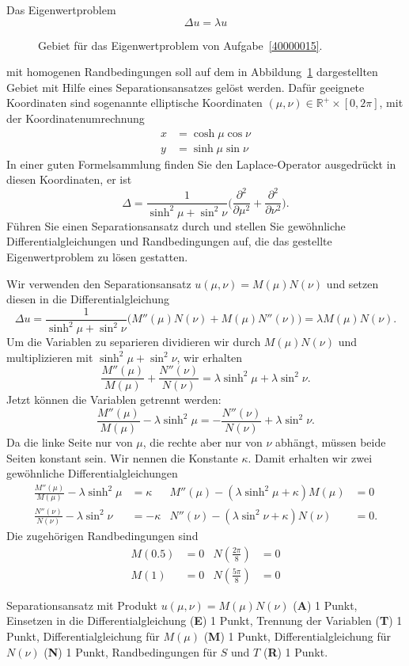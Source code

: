 Das Eigenwertproblem 
\[
\Delta u = \lambda u
\]
\begin{figure}
\centering
{}
\caption{Gebiet für das Eigenwertproblem von Aufgabe~\ref{40000015}.
\label{40000015:gebiet}}
\end{figure}%
mit homogenen Randbedingungen soll auf dem in Abbildung~\ref{40000015:gebiet}
dargestellten Gebiet
mit Hilfe eines Separationsansatzes gelöst werden.
Dafür geeignete Koordinaten sind sogenannte elliptische Koordinaten
$(\mu,\nu)\in \mathbb R^+\times [0,2\pi]$, mit der Koordinatenumrechnung
\begin{align*}
x&=\cosh\mu\cos\nu
\\
y&=\sinh\mu\sin\nu
\end{align*}
In einer guten Formelsammlung finden Sie den Laplace-Operator ausgedrückt
in diesen Koordinaten, er ist
\[
\Delta
=
\frac1{\sinh^2\mu+\sin^2\nu}
\biggl(
\frac{\partial^2}{\partial \mu^2}+\frac{\partial^2}{\partial\nu^2}
\biggr).
\]
Führen Sie einen Separationsansatz durch und stellen Sie gewöhnliche
Differentialgleichungen und Randbedingungen auf, die das gestellte
Eigenwertproblem zu lösen gestatten.

\begin{loesung}
Wir verwenden den Separationsansatz $u(\mu,\nu)=M(\mu)N(\nu)$ und
setzen diesen in die Differentialgleichung
\[
\Delta u
=
\frac1{\sinh^2\mu+\sin^2\nu}
\biggl(
M''(\mu)N(\nu) + M(\mu)N''(\nu)
\biggr)
=
\lambda M(\mu)N(\nu).
\]
Um die Variablen zu separieren dividieren wir durch $M(\mu)N(\nu)$
und multiplizieren mit $\sinh^2\mu+\sin^2\nu$, wir erhalten
\[
\frac{M''(\mu)}{M(\mu)}
+
\frac{N''(\nu)}{N(\nu)}
=
\lambda\sinh^2\mu + \lambda \sin^2\nu.
\]
Jetzt können die Variablen getrennt werden:
\[
\frac{M''(\mu)}{M(\mu)}-\lambda\sinh^2\mu
=
-\frac{N''(\nu)}{N(\nu)}+\lambda\sin^2\nu.
\]
Da die linke Seite nur von $\mu$, die rechte aber nur von $\nu$ abhängt,
müssen beide Seiten konstant sein.
Wir nennen die Konstante $\kappa$.
Damit erhalten wir zwei gewöhnliche Differentialgleichungen
\begin{align*}
\frac{M''(\mu)}{M(\mu)}-\lambda\sinh^2\mu &=  \kappa
&
M''(\mu)-(\lambda\sinh^2\mu+\kappa)M(\mu)&=0
\\
\frac{N''(\nu)}{N(\nu)}-\lambda\sin^2\nu &= -\kappa
&
N''(\nu)-(\lambda\sin^2\nu+\kappa)N(\nu)&=0.
\end{align*}
Die zugehörigen Randbedingungen sind
\begin{align*}
M(0.5)&=0&
N({\textstyle\frac{2\pi}{8}})&=0
\\
M(1)&=0&
N({\textstyle\frac{5\pi}{8}})&=0
\end{align*}
\end{loesung}

\begin{bewertung}
Separationsansatz mit Produkt $u(\mu,\nu) = M(\mu)N(\nu)$ ({\bf A}) 1 Punkt,
Einsetzen in die Differentialgleichung ({\bf E}) 1 Punkt,
Trennung der Variablen ({\bf T}) 1 Punkt,
Differentialgleichung für $M(\mu)$ ({\bf M}) 1 Punkt,
Differentialgleichung für $N(\nu)$ ({\bf N}) 1 Punkt,
Randbedingungen für $S$ und $T$ ({\bf R}) 1 Punkt.
\end{bewertung}

